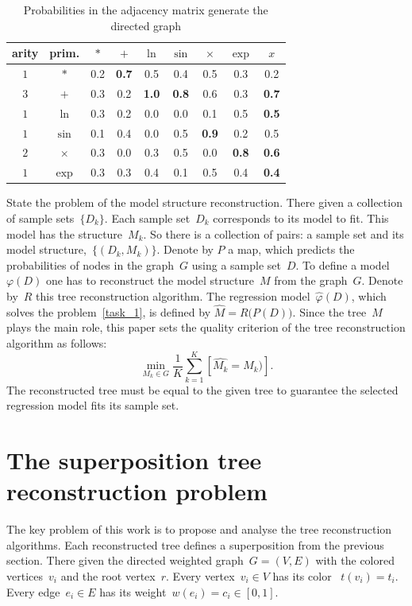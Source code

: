 \documentclass[12pt]{article}
\begin{document}
\begin{table}[!htp]
    \centering
        \caption{Probabilities in the adjacency matrix generate the directed graph}
        \begin{tabular}{|c|c|ccccccc|}
            \hline
            arity&prim.&$\ast$&$+$&$\ln$&$\sin$&$\times$&$\exp$&$x$\\
            \hline
            $1$&$\ast$ &0.2&{\bf 0.7}&0.5&0.4&0.5&0.3&0.2\\
            $3$&$+$    &0.3&0.2&{\bf 1.0}&{\bf 0.8}&0.6&0.3&{\bf 0.7}\\
            $1$&$\ln$  &0.3&0.2&0.0&0.0&0.1&0.5&{\bf 0.5}\\
            $1$&$\sin$ &0.1&0.4&0.0&0.5&{\bf 0.9}&0.2&0.5\\
            $2$&$\times$&0.3&0.0&0.3&0.5&0.0&{\bf 0.8}&{\bf 0.6}\\
            $1$&$\exp$ &0.3&0.3&0.4&0.1&0.5&0.4&{\bf 0.4}\\
            \hline
        \end{tabular}
    \label{restored_adjacency_matrix}
\end{table}

State the problem of the model structure reconstruction. There given a collection of sample sets~$\{D_k\}$. Each sample set~$D_k$ corresponds to its model to fit. This model has the structure~$M_k$. So there is a collection of pairs: a sample set and its model structure,~$\{(D_k, M_k)\}$.
Denote by $P$ a map, which predicts the probabilities of nodes in the graph~$G$ using a sample set~$D$. To define a model~$\varphi(D)$ one has to reconstruct the model structure~$M$ from the graph~$G$. Denote by~$R$ this tree reconstruction algorithm. The regression model~$\hat{\varphi}(D)$, which solves the problem~\eqref{task_1}, is defined by
$
\hat{M}=R\bigl(P(D)\bigr).
$
Since the tree~$M$ plays the main role, this paper sets the quality criterion of the tree reconstruction algorithm as follows:
\[
\min_{M_k \in G} \frac{1}{K}\sum_{k=1}^K [ \hat{M_k} = M_k)].
\]
The reconstructed tree must be equal to the given tree to guarantee the selected regression model fits its sample set.

\section{The superposition tree reconstruction problem}

The key problem of this work is to propose and analyse the tree reconstruction algorithms. Each reconstructed tree defines a superposition from the previous section. There given the directed weighted graph~$G=(V,E)$ with the colored vertices~$v_i$ and the root vertex~$r$. Every vertex~$v_i \in V$ has its color ~$t(v_i)=t_i$. Every edge~$e_i\in E$ has its weight~\mbox{$w(e_i)=c_i\in[0,1]$}.
\end{document}
